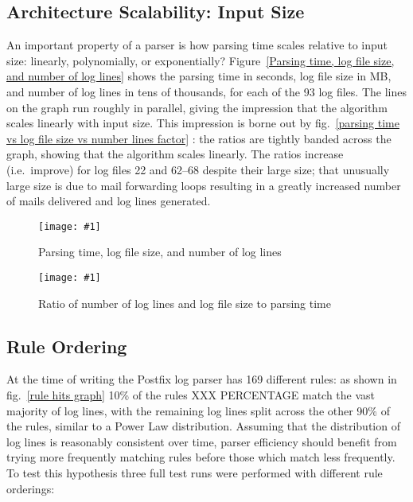 \documentclass{svmult}
\newcommand{\showgraph}[3]{%
    \begin{figure}[btp]%
        \texttt{[image: \#1]}%
        \caption{#2}\label{#3}%
    \end{figure}%
}
\newcommand{\refwithlabel}[2]{%
    #1~\vref{#2}%
}
\newcommand{\graphref}[1]{%
    \refwithlabel{fig.}{#1}%
}
\newcommand{\Graphref}[1]{%
    \refwithlabel{Figure}{#1}%
}
\newcommand{\numberOFlogFILES}[0]{%
    93%
}
\newcommand{\numberOFrules}[0]{%
    169%
}
\begin{document}
\subsection{Architecture Scalability: Input Size}

An important property of a parser is how parsing time scales relative to
input size: linearly, polynomially, or exponentially?  \Graphref{Parsing
time, log file size, and number of log lines} shows the parsing time in
seconds, log file size in MB, and number of log lines in tens of thousands,
for each of the \numberOFlogFILES{} log files.  The lines on the graph run
roughly in parallel, giving the impression that the algorithm scales
linearly with input size.  This impression is borne out by
\graphref{parsing time vs log file size vs number lines factor}: the ratios
are tightly banded across the graph, showing that the algorithm scales
linearly.  The ratios increase (i.e.\ improve) for log files 22 and 62--68
despite their large size; that unusually large size is due to mail
forwarding loops resulting in a greatly increased number of mails delivered
and log lines generated.

\showgraph{build/graph-input-size-vs-parsing-time}{Parsing time, log file size,
and number of log lines}{Parsing time, log file size, and number of log lines}
\showgraph{build/graph-input-size-vs-parsing-time-ratio}{Ratio of number of
log lines and log file size to parsing time}{parsing time vs log file size vs
number lines factor}

\subsection{Rule Ordering}

\label{Rule ordering}

At the time of writing the Postfix log parser has \numberOFrules{}
different rules: as shown in \graphref{rule hits graph} 10\% of the rules
XXX PERCENTAGE match the vast majority of log lines, with the remaining log lines split
across the other 90\% of the rules, similar to a Power Law distribution.
Assuming that the distribution of log lines is reasonably consistent over
time, parser efficiency should benefit from trying more frequently matching
rules before those which match less frequently.  To test this hypothesis
three full test runs were performed with different rule orderings:
\end{document}
